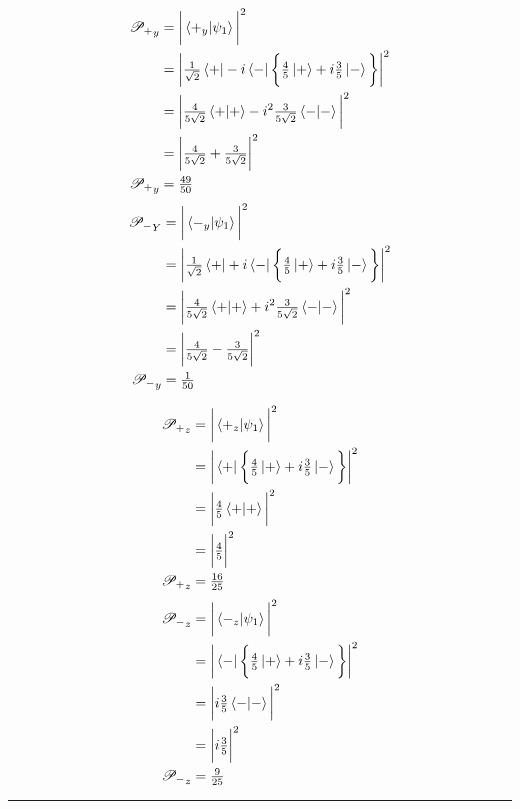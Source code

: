 \documentclass[paper=a4, fontsize=11pt]{scrartcl} %
\numberwithin{equation}{section} %
\numberwithin{figure}{section} %
\numberwithin{table}{section} %
\newcommand{\horrule}[1]{\rule{\linewidth}{#1}} %
\begin{document}
   \begin{multicols}{2}
 \noindent
\begin{align*}
\mathscr{P_+}_y & = \bigg | \braket{+_y|\psi_1} \bigg|^2 \\
& = \bigg | \tfrac{1}{\sqrt{2}}\bra{+} - i\bra{-} \bigg \{ \tfrac{4}{5}\ket{+} + i\tfrac{3}{5}\ket{-} \bigg \} \bigg |^2 \\
& = \bigg |  \tfrac{4}{5\sqrt{2}}\braket{+|+} - i^2\tfrac{3}{5\sqrt{2}} \braket{-|-}  \bigg |^2 \\
  & = \bigg |  \tfrac{4}{5\sqrt{2}} + \tfrac{3}{5\sqrt{2}} \bigg |^2 \\
  \mathscr{P_+}_y & = \tfrac{49}{50}
  \end{align*}
   \begin{align*}
\mathscr{P_-}_Y & = \bigg |  \braket{-_y|\psi_1} \bigg|^2 \\
& = \bigg | \tfrac{1}{\sqrt{2}} \bra{+} + i \bra{-} \bigg \{ \tfrac{4}{5}\ket{+} + i\tfrac{3}{5}\ket{-} \bigg \} \bigg |^2 \\
& = \bigg |  \tfrac{4}{5\sqrt{2}}\braket{+|+} + i^2\tfrac{3}{5\sqrt{2}} \braket{-|-}  \bigg |^2 \\
 & = \bigg |  \tfrac{4}{5\sqrt{2}} - \tfrac{3}{5\sqrt{2}} \bigg |^2 \\
  \mathscr{P_-}_y & = \tfrac{1}{50}
  \end{align*}
  \end{multicols}
   \begin{multicols}{2}
 \noindent
\begin{align*}
\mathscr{P_+}_z & = \bigg | \braket{+_z|\psi_1} \bigg|^2 \\
& = \bigg | \bra{+}  \bigg \{ \tfrac{4}{5}\ket{+} + i\tfrac{3}{5}\ket{-} \bigg \} \bigg |^2 \\
& = \bigg |  \tfrac{4}{5}\braket{+|+}  \bigg |^2 \\
  & = \bigg |  \tfrac{4}{5} \bigg |^2 \\
  \mathscr{P_+}_z & = \tfrac{16}{25}
  \end{align*}
   \begin{align*}
\mathscr{P_-}_z & = \bigg |  \braket{-_z|\psi_1} \bigg|^2 \\
& = \bigg |  \bra{-} \bigg \{ \tfrac{4}{5}\ket{+} + i\tfrac{3}{5}\ket{-} \bigg \} \bigg |^2 \\
& = \bigg |    i\tfrac{3}{5} \braket{-|-}  \bigg |^2 \\
 & = \bigg |  i \tfrac{3}{5} \bigg |^2 \\
  \mathscr{P_-}_z & = \tfrac{9}{25}
  \end{align*}
  \end{multicols}\horrule{2pt} 
\end{document}
